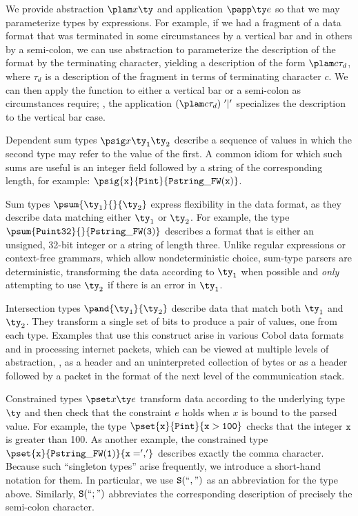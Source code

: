 We provide abstraction $\plam x {} \ty$ and application
$\papp \ty e$ so that we may parameterize types by expressions.  For
example, if we had a fragment of a data format that was terminated in some
circumstances by a vertical bar and in others by a semi-colon, we 
can use abstraction to parameterize the description of the format by
the terminating character, yielding a description of the form
$\plam c {} {\tau_d} $, where $\tau_d$ is a description of the
fragment in terms of terminating character $c$.  We can then
apply the function to either a vertical bar or a semi-colon as
circumstances require; \ie{},  the application $(\plam c {} {\tau_d})
\ \mathtt{'|'}$  specializes the description to the vertical bar case.

Dependent sum types $\psig x {\ty_1} {\ty_2}$ describe a sequence
of values in which the second type may refer to the value of the
first.  A common idiom for which such sums are useful is an integer
field followed by a string of the corresponding length, for example: 
$\psig {\mathtt{x}} {\mathtt{Pint}} {\mathtt{Pstring\_FW(x)}}$.

Sum types $\psum {\ty_1} {} {\ty_2}$
express flexibility in the data format, as they describe
data matching either $\ty_1$ or $\ty_2$.  For example, the type
$\psum{\mathtt{Puint32}}{}{\mathtt{Pstring\_FW(3)}}$ describes a format that
is either an unsigned, 32-bit integer or a string of length three.
Unlike regular expressions or
context-free grammars, which allow nondeterministic choice,
sum-type parsers
are deterministic, transforming the data according to $\ty_1$
when possible and {\it only} attempting to
use $\ty_2$ if there is an error in $\ty_1$. 

Intersection types
$\pand {\ty_1} {\ty_2}$ describe data that match both $\ty_1$ and
$\ty_2$. They transform a single set of bits to produce
a pair of values, one from each type.  Examples that use this
construct arise in various Cobol data formats and in processing
internet packets, which can be viewed at multiple levels of
abstraction, \eg{}, as a header and an uninterpreted collection of
bytes or as a header followed by a packet in the format of the next
level of the communication stack. 

Constrained types $\pset x \ty e$ transform data according to the
underlying type $\ty$ and then check that the constraint $e$ holds
when $x$ is bound to the parsed value. For example, the type 
$\pset {\mathtt{x}} {\mathtt{Pint}} {\mathtt{x > 100}}$ checks that the integer 
$\mathtt{x}$ is greater than 100.  As another example,  the constrained type
$\pset{\mathtt{x}}{\mathtt{Pstring\_FW(1)}}{\mathtt{x = ','}}$
describes exactly the comma character. Because such ``singleton
types'' arise frequently, we
introduce a short-hand notation for them.  In particular, we use
$\mathtt{S(``,")}$ as an abbreviation for the type above. Similarly,
$\mathtt{S(``;")}$  abbreviates the corresponding description of precisely
the semi-colon character.

